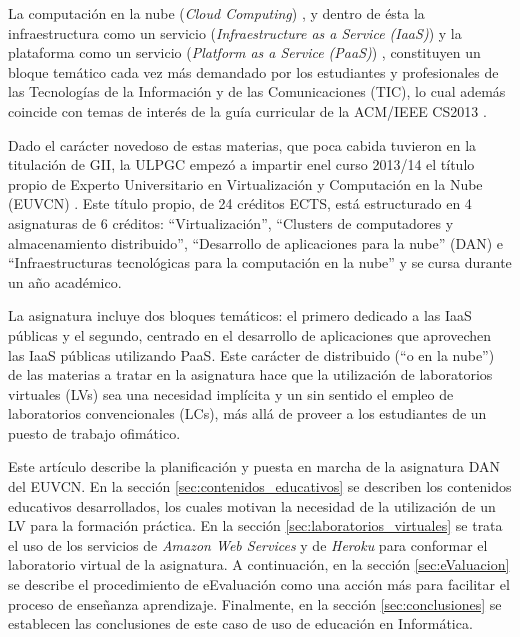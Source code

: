 \documentclass[conference]{IEEEtran}
\begin{document}
La computación en la nube (\textit{Cloud Computing}) \cite{Buyya:2013}, y dentro
de ésta la
infraestructura como
un servicio (\textit{Infraestructure as a Service (IaaS)})
y 
la plataforma como un servicio (\textit{Platform as a Service (PaaS)})
\cite{Carlson:2013},
constituyen un bloque temático cada vez más demandado por los estudiantes y
profesionales de las Tecnologías de la Información y de las Comunicaciones
(TIC), lo cual además coincide con temas de interés de la guía curricular de la ACM/IEEE CS2013 \cite{acm:2013}.




Dado
el carácter novedoso de estas materias, que poca cabida tuvieron en la
titulación de GII, la ULPGC empezó a impartir enel curso 2013/14 el título propio de Experto Universitario en
Virtualización y Computación en la Nube (EUVCN) \cite{Experto:2014}. Este título
propio, de 24
créditos ECTS,
está estructurado  en 4 asignaturas de 6 créditos:
``Virtualización'',
``Clusters de computadores y almacenamiento distribuido'', ``Desarrollo de
aplicaciones para la nube'' (DAN) e ``Infraestructuras tecnológicas para la
computación en la nube'' y se cursa durante un año académico.

La asignatura  incluye dos
bloques temáticos: el primero dedicado a las IaaS públicas y el segundo,
centrado en el desarrollo de aplicaciones que aprovechen las IaaS públicas
utilizando PaaS. Este carácter de distribuido (``o en la nube'') de las
materias a tratar en la asignatura hace que la utilización de
laboratorios virtuales (LVs) \cite{Zhang:2010} sea una necesidad implícita y un
sin sentido el
empleo de
laboratorios convencionales (LCs), más allá de proveer a los estudiantes de un puesto de trabajo
ofimático.





Este artículo describe la planificación y puesta en marcha de la asignatura
DAN del EUVCN. En  la sección \ref{sec:contenidos_educativos} se describen los
contenidos educativos desarrollados, los cuales motivan la necesidad de la
utilización de un LV para la formación práctica. En la sección
\ref{sec:laboratorios_virtuales} se trata el uso de los servicios de
\textit{Amazon Web Services} \cite{AWS:2011} y de \textit{Heroku}
\cite{Heroku:2013} para conformar el laboratorio
virtual de la asignatura. A continuación, en la sección \ref{sec:eValuacion}
se describe el procedimiento de eEvaluación \cite{Moral2013} como una acción más para facilitar el proceso de enseñanza aprendizaje. Finalmente, en la sección
\ref{sec:conclusiones} se establecen las conclusiones de este caso de uso de
educación en Informática.
\end{document}

